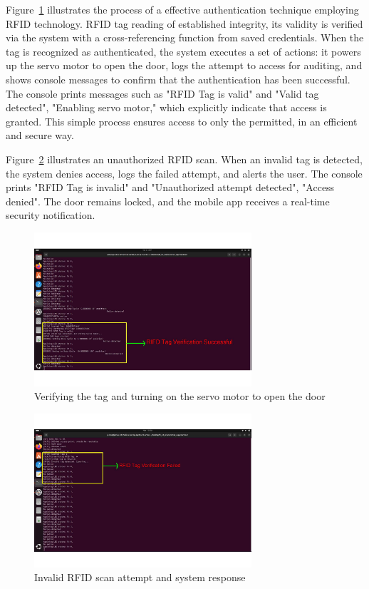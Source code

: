 \documentclass[a4paper]{scrartcl}
\begin{document}
Figure~\ref{fig:action} illustrates the process of a effective authentication technique employing RFID technology. RFID tag reading of established integrity, its validity is verified via the system with a cross-referencing function from saved credentials. When the tag is recognized as authenticated, the system executes a set of actions: it powers up the servo motor to open the door, logs the attempt to access for auditing, and shows console messages to confirm that the authentication has been successful. The console prints messages such as "RFID Tag is valid" and "Valid tag detected", "Enabling servo motor," which explicitly indicate that access is granted. This simple process ensures access to only the permitted, in an efficient and secure way.

Figure~\ref{fig:invalidaction} illustrates an unauthorized RFID scan. When an invalid tag is detected, the system denies access, logs the failed attempt, and alerts the user. The console prints "RFID Tag is invalid" and "Unauthorized attempt detected", "Access denied". The door remains locked, and the mobile app receives a real-time security notification.



\begin{figure}[H]
    \centering
    \includegraphics[width=0.72\textwidth]{motoraction.pdf}
    \caption{Verifying the tag and turning on the servo motor to open the door}
    \label{fig:action}
\end{figure}

\begin{figure}[H]
    \centering
    \includegraphics[width=0.72\textwidth]{inmotoraction.pdf}
    \caption{Invalid RFID scan attempt and system response}
    \label{fig:invalidaction}
\end{figure}
\end{document}
